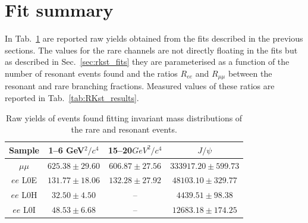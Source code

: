\section{Fit summary}

In Tab.~\ref{tab:RKst_yields} are reported raw yields obtained from the
fits described in the previous sections. The values for the rare channels are not
directly floating in the fits but as described in Sec.~\ref{sec:rkst_fits} they are parameterised
as a function of the number of resonant events found and the ratios $R_{ee}$ and $R_{\mu\mu}$
between the resonant and rare branching fractions. Measured values of these ratios are reported 
in Tab.~\ref{tab:RKst_results}.

\begin{table}
\centering
\begin{tabular}{|c|c|c|c|}
\hline
 Sample 			& 1--6 GeV$^2/c^4$ 				& 15--20$ GeV^2/c^4$ 				& $J/\psi$  \\ \hline
$\mu\mu$ 			& $ 625.38  \pm  29.60 $ & $ 606.87  \pm  27.56 $ & $ 333917.20  \pm  599.73 $ \\
$ee$ L0E 	& $ 131.77  \pm  18.06 $ & $ 132.28  \pm  27.92 $ & $ 48103.10  \pm  329.77 $ \\
$ee$ L0H 	& $ 32.50  \pm  4.50 $ & -- & $ 4439.51  \pm  98.38 $ \\
$ee$ L0I 	& $ 48.53  \pm  6.68 $ & -- & $ 12683.18  \pm  174.25 $ \\
\hline 
 \end{tabular}
\caption{Raw yields of events found fitting invariant mass distributions of the rare and resonant events. }
\label{tab:RKst_yields}
\end{table}


\clearpage

